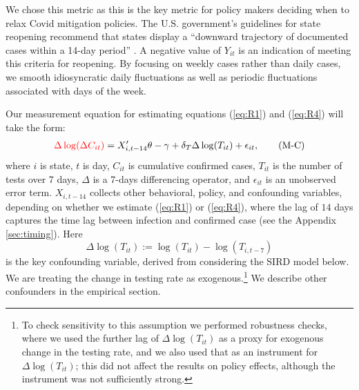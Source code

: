\documentclass[11pt,reqno,letter]{amsart}
\theoremstyle{definition}
\def\ycolor{\color{red}}
\begin{document}
We chose this metric as this is the key metric for policy makers deciding when to relax Covid mitigation policies.  The U.S. government's guidelines for state reopening
recommend that states display a
``downward trajectory of documented cases within a 14-day period''
\citep{whitehouse2020}. A negative value of
$Y_{it}$ is an indication of meeting this
criteria for reopening. By focusing on weekly cases  rather than daily cases, we smooth idiosyncratic daily fluctuations as well as periodic fluctuations associated with days of the week.

Our measurement equation for estimating equations (\ref{eq:R1}) and (\ref{eq:R4}) will take the form:
\begin{align}
{\ycolor \Delta \log(\Delta C_{it})}  =    X_{i,t-14} '   \theta  -\gamma +  \delta_T \Delta   \log(T_{it})  + \epsilon_{it},
 \label{eq:M} \tag{M-C}
\end{align}
where $i$ is state, $t$ is day, $C_{it}$ is cumulative confirmed
cases, $T_{it}$ is the number of tests over 7 days, $\Delta$ is
a 7-days differencing operator, and $\epsilon_{it}$ is an unobserved error term.
 $X_{i,t-14}$  collects other behavioral, policy, and confounding variables, depending
on whether we estimate (\ref{eq:R1}) or (\ref{eq:R4}), where the lag of $14$ days captures the time lag between infection and confirmed case (see the Appendix \ref{sec:timing}). %
   Here
$$\Delta   \log(T_{it} ):=  \log(T_{it}) - \log(T_{i,t-7})  $$ %
is the key confounding variable,
derived from considering the SIRD model below. We are treating the change in testing
rate as exogenous.\footnote{To check sensitivity to this assumption
we performed robustness checks, where we used
the further lag of $\Delta   \log(T_{it} )$ as a proxy for exogenous change in the testing rate, and we also
used that as an instrument for $\Delta   \log(T_{it} )$; this did not affect the results on policy effects, although the instrument
was not sufficiently strong.} We describe other confounders in the empirical section.

\end{document}
